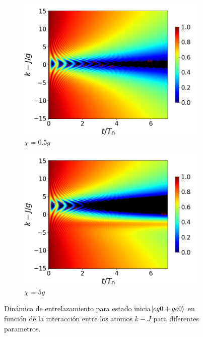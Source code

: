 \begin{figure}[h!]
    \begin{subfigure}{0.49\textwidth}
        \includegraphics[width=\textwidth]{figuras/ch4/concu/k/eg0+ge0 d=0.0g x=0.5g J=15.0g gamma=0.25g concu k dis.png}
        \caption{$\chi=0.5g$}
        \label{fig4:concu k x1}
    \end{subfigure}
    \hfill
    \begin{subfigure}{0.49\textwidth}
        \includegraphics[width=\textwidth]{figuras/ch4/concu/k/eg0+ge0 d=0.0g x=5.0g J=15.0g gamma=0.25g concu k dis.png}
        \caption{$\chi=5g$}
        \label{fig4:concu k x2}
    \end{subfigure}
    \caption{Dinámica de entrelazamiento para estado inicia$\ket{eg0+ge0}$ en función de la interacción entre los atomos $k-J$ para diferentes parametros.}
    \label{fig4:concu k params}
\end{figure}

